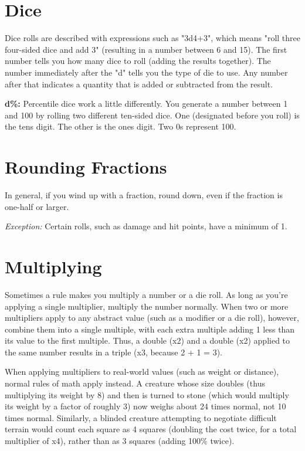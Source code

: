\section{Dice}

Dice rolls are described with expressions such as "3d4+3", which means "roll 
three four-sided dice and add 3" (resulting in a number between 6 and 15). The 
first number tells you how many dice to roll (adding the results together). The 
number immediately after the "d" tells you the type of die to use. Any number 
after that indicates a quantity that is added or subtracted from the result.

\textbf{d\%:} Percentile dice work a little differently. You generate a number 
between 1 and 100 by rolling two different ten-sided dice. One (designated before 
you roll) is the tens digit. The other is the ones digit. Two 0s represent 100.

\section{Rounding Fractions}

In general, if you wind up with a fraction, round down, even if the fraction is 
one-half or larger.

\textit{Exception:} Certain rolls, such as damage and hit points, have a minimum 
of 1.

\section{Multiplying}

Sometimes a rule makes you multiply a number or a die roll. As long as you're applying 
a single multiplier, multiply the number normally. When two or more multipliers 
apply to any abstract value (such as a modifier or a die roll), however, combine 
them into a single multiple, with each extra multiple adding 1 less than its value 
to the first multiple. Thus, a double (x2) and a double (x2) 
applied to the same number results in a triple (x3, because 2 
+ 1 = 3).


When applying multipliers to real-world values (such as weight or distance), normal 
rules of math apply instead. A creature whose size doubles (thus multiplying its 
weight by 8) and then is turned to stone (which would multiply its weight by a 
factor of roughly 3) now weighs about 24 times normal, not 10 times normal. Similarly, 
a blinded creature attempting to negotiate difficult terrain would count each square 
as 4 squares (doubling the cost twice, for a total multiplier of x4), 
rather than as 3 squares (adding 100\% twice). 

